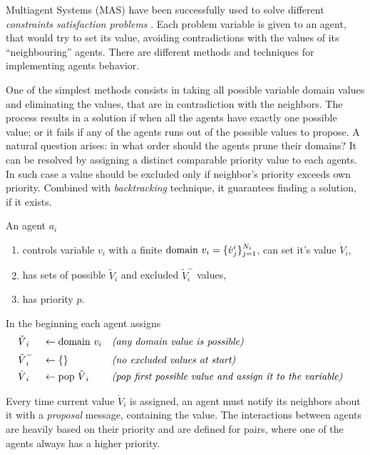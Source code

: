 \documentclass[ThesisDoc]{subfiles}
\begin{document}
Multiagent Systems (MAS) have been successfully used to solve
different \emph{constraints satisfaction problems} \cite{MAS, MAS-Survey}.
Each problem variable is given to an agent, that would try to set its value,
avoiding contradictions with the values of its ``neighbouring'' agents.
There are different methods and techniques for implementing agents behavior.

One of the simplest methods consists in taking all possible variable domain values
and eliminating the values, that are in contradiction with the neighbors.
The process results in a solution if when all the agents have exactly one
possible value; or it fails if any of the agents runs out of the possible
values to propose. A natural question arises: in what order should the agents
prune their domains?
It can be resolved by assigning a distinct comparable priority value to each agents.
In such case a value should be excluded only if neighbor's priority exceeds own priority.
Combined with \emph{backtracking} technique, it guarantees finding a solution,
if it exists.

\noindent
An agent $a_i$
\begin{enumerate}
  \item controls variable $v_i$ with a finite $\mathrm{domain}~v_i =
        \{{\dot v}^i_j\}_{j=1}^{N_i}$, can set it's value ${\dot V}_i$,
  \item has sets of possible ${\tilde V}_i$ and excluded ${\tilde V}_i^-$ values,
  \item has priority $p$.
\end{enumerate}

\noindent
In the beginning each agent assigns
\begin{align*}
  &{\tilde V}_i   &&\leftarrow \mathrm{domain}~v_i       && \textit{(any domain value is possible)} & \\
  &{\tilde V}_i^- &&\leftarrow \{\}              && \textit{(no excluded values at start)}  &\\
  &{\dot V}_i     &&\leftarrow \mathrm{pop}~{\tilde V}_i && \textit{(pop first possible value and assign it to the variable)} &\\
\end{align*}

Every time current value ${\dot V}_i$ is assigned, an agent must notify its
neighbors about it with a \emph{proposal} message, containing the value.
The interactions between agents are heavily based on their priority and are
defined for pairs, where one of the agents always has a higher priority.
\end{document}
